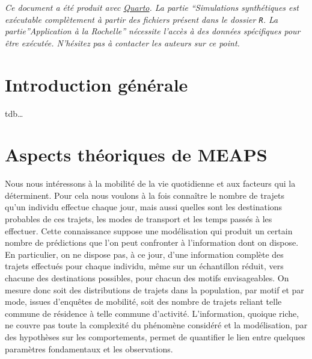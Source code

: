 \documentclass[
  10pt,
  a4paper,
  numbers=noendperiod,
  DIV=9]{scrreprt}
\begin{document}
\emph{Ce document a été produit avec \href{https://quarto.org}{Quarto}.
La partie ``Simulations synthétiques est exécutable complètement à
partir des fichiers présent dans le dossier \texttt{R}. La
partie''Application à la Rochelle'' nécessite l'accès à des données
spécifiques pour être exécutée. N'hésitez pas à contacter les auteurs
sur ce point.}


\hypertarget{introduction-guxe9nuxe9rale}{%
\chapter*{Introduction générale}\label{introduction-guxe9nuxe9rale}}


tdb\ldots{}


\hypertarget{aspects-thuxe9oriques-de-meaps}{%
\chapter{Aspects théoriques de
MEAPS}\label{aspects-thuxe9oriques-de-meaps}}

Nous nous intéressons à la mobilité de la vie quotidienne et aux
facteurs qui la déterminent. Pour cela nous voulons à la fois connaître
le nombre de trajets qu'un individu effectue chaque jour, mais aussi
quelles sont les destinations probables de ces trajets, les modes de
transport et les temps passés à les effectuer. Cette connaissance
suppose une modélisation qui produit un certain nombre de prédictions
que l'on peut confronter à l'information dont on dispose. En
particulier, on ne dispose pas, à ce jour, d'une information complète
des trajets effectués pour chaque individu, même sur un échantillon
réduit, vers chacune des destinations possibles, pour chacun des motifs
envisageables. On mesure donc soit des distributions de trajets dans la
population, par motif et par mode, issues d'enquêtes de mobilité, soit
des nombre de trajets reliant telle commune de résidence à telle commune
d'activité. L'information, quoique riche, ne couvre pas toute la
complexité du phénomène considéré et la modélisation, par des hypothèses
sur les comportements, permet de quantifier le lien entre quelques
paramètres fondamentaux et les observations.
\end{document}
